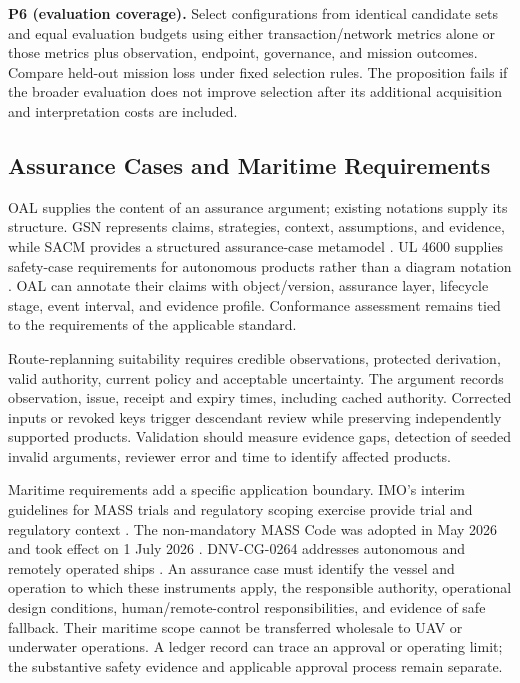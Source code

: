 \textbf{P6 (evaluation coverage).} Select configurations from identical candidate sets and equal evaluation budgets using either transaction/network metrics alone or those metrics plus observation, endpoint, governance, and mission outcomes. Compare held-out mission loss under fixed selection rules. The proposition fails if the broader evaluation does not improve selection after its additional acquisition and interpretation costs are included.

\subsection{Assurance Cases and Maritime Requirements}\label{sec:assurance-case}

OAL supplies the content of an assurance argument; existing notations supply its structure. GSN represents claims, strategies, context, assumptions, and evidence, while SACM provides a structured assurance-case metamodel \citep{gsn2021,sacm2023}. UL 4600 supplies safety-case requirements for autonomous products rather than a diagram notation \citep{ul4600}. OAL can annotate their claims with object/version, assurance layer, lifecycle stage, event interval, and evidence profile. Conformance assessment remains tied to the requirements of the applicable standard.

Route-replanning suitability requires credible observations, protected derivation, valid authority, current policy and acceptable uncertainty. The argument records observation, issue, receipt and expiry times, including cached authority. Corrected inputs or revoked keys trigger descendant review while preserving independently supported products. Validation should measure evidence gaps, detection of seeded invalid arguments, reviewer error and time to identify affected products.

Maritime requirements add a specific application boundary. IMO's interim guidelines for MASS trials and regulatory scoping exercise provide trial and regulatory context \citep{imo2019trials,imo2021scoping}. The non-mandatory MASS Code was adopted in May 2026 and took effect on 1 July 2026 \citep{imo2026mass}. DNV-CG-0264 addresses autonomous and remotely operated ships \citep{dnv2024autonomous}. An assurance case must identify the vessel and operation to which these instruments apply, the responsible authority, operational design conditions, human/remote-control responsibilities, and evidence of safe fallback. Their maritime scope cannot be transferred wholesale to UAV or underwater operations. A ledger record can trace an approval or operating limit; the substantive safety evidence and applicable approval process remain separate.

